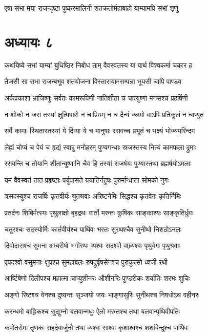 \twolineshloka
{एषा सभा मया राजन्दृष्टा पुष्करमालिनी}
{शतक्रतोर्महाबाहो याम्यामपि सभां शृणु}


\chapter{अध्यायः ८}
\twolineshloka
{कथयिष्ये सभां याम्यां युधिष्ठिर निबोध ताम्}
{वैवस्वतस्य यां पार्थ विश्वकर्मा चकार ह}


\twolineshloka
{तैजसी सा सभा राजन्बभूव शतयोजना}
{विस्तारायामसम्पन्ना भूयसी चापि पाण्डव}


\twolineshloka
{अर्कप्रकाशा भ्राजिष्णुः सर्वतः कामरूपिणी}
{नातिशीता च चात्युष्णा मनसश्च प्रहर्षिणी}


\twolineshloka
{न शोको न जरा तस्यां क्षुत्पिपासे न चाप्रियम्}
{न च दैन्यं क्लमो वाऽपि प्रतिकूलं न चाप्युत}


\twolineshloka
{सर्वे कामाः स्थितास्तस्यां ये दिव्या ये च मानुषाः}
{रसवच्च प्रभूतं च भक्ष्यं भोज्यमरिन्दम}


\twolineshloka
{लेह्यं चोप्यं च पेयं च हृद्यं स्वादु मनोहरम्}
{पुण्यगन्धाः स्रजस्तस्य नित्यं कामफला द्रुमाः}


\twolineshloka
{रसवन्ति च तोयानि शीतान्युष्णानि चैव हि}
{तस्यां राजर्षयः पुण्यास्तथा ब्रह्मर्षयोऽमलाः}


\twolineshloka
{यमं वैवस्वतं तात प्रहृष्टाः पर्युपासते}
{ययातिर्नहुषः पुरुर्मान्धाता सोमको नुगः}


\twolineshloka
{त्रसदस्युश्च राजर्षिः कृतवीर्यः श्रुतश्रवाः}
{अरिष्टनेमिः सिद्धश्च कृतवेगः कृतिर्निमिः}


\twolineshloka
{प्रतर्दनः शिबिर्मत्स्यः पृथुलाक्षो बृहद्रथः}
{वार्तो मरुत्तः कुषिकः साङ्काश्यः साङ्कृतिर्ध्रुवः}


\twolineshloka
{चतुरश्चः सदस्योर्मिः कार्तवीर्यश्च पार्थिवः}
{भरतः सुरथश्चैव सुनीथो निशठोऽनलः}


\twolineshloka
{दिवोदासश्च सुमना अम्बरीषो भगीरथः}
{व्यश्वः सदश्वो वाघ्र्यश्वः पृथुवेगः पृथुश्रवाः}


\twolineshloka
{पृपदश्वो वसुमनाः क्षुपश्च सुमहाबलः}
{रुषद्रुर्वृषसेनश्च पुरुकुत्सो ध्वजी रथी}


\twolineshloka
{आर्ष्टिषेणो दिलीपश्च महात्मा चाप्युशीनरः}
{औशीनरिः पुण्डरीकः शर्यातिः शरभः शुचिः}


\twolineshloka
{अङ्गो रिष्टश्च वेनश्च दुष्यन्तः सृञ्जयो जयः}
{भाङ्गासुरिः सुनीथश्च निषधोऽथ वहीनरः}


\twolineshloka
{करन्धमो बाह्लिकश्च सुद्युम्नो बलवान्मधुः}
{ऐलो मरुत्तश्च तथा बलवान्पृथिवीपतिः}


\twolineshloka
{कपोतरोमा तृणकः सहदेवार्जुनौ तथा}
{व्यश्वः साश्वः कृशाश्वश्च शशबिन्दुश्च पार्थिवः}


